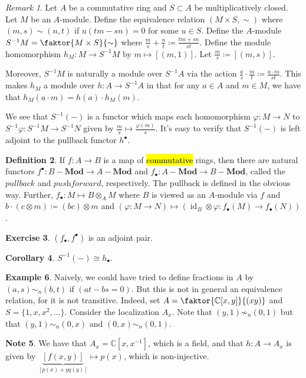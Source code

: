\documentclass[10pt,letterpaper,cm]{nupset}
\theoremstyle{definition}
\newtheorem{definition}{Definition}[subsection]
\newtheorem{exmp}[definition]{Example}
\newtheorem{note}[definition]{Note}
\theoremstyle{theorem}
\newtheorem{corollary}[definition]{Corollary}
\newtheorem{exercise}[definition]{Exercise}
\theoremstyle{remark}
\newtheorem{remark}[definition]{Remark}
\newcommand{\C}{\mathbb C}
\newcommand{\1}{\mathbf{1}}
\newcommand{\0}{\vec 0}
\DeclareMathOperator{\id}{id}
\begin{document}
\begin{remark}
Let $A$ be a commutative ring and $S \subset A$ be multiplicatively closed. Let $M$ be an $A$-module. Define the equivalence relation $(M \times S, \sim)$ where $(m, s) \sim (n, t)$ if $u(tm - sn) = 0$ for some $u\in S$. Define the $A$-module $S^{-1}M = \faktor{M \times S}{\sim}$ where $\frac{m}{s} + \frac{n}{t} \coloneqq  \frac{tm + sn}{st}$. Define the module homomorphism $h_M : M \to S^{-1}M$ by $m \mapsto [(m,1)]$.  Let $\frac{m}{s} \coloneqq  [(m,s)]$.

Moreover, $S^{-1}M$ is naturally a module over $S^{-1}A$ via the action $\frac{a}{s} \cdot \frac{m}{t} \coloneqq  \frac{a\cdot m}{st}$. This makes $h_M$ a module over $h: A \to S^{-1}A$ in  that for any $a\in A$ and $m\in M$, we have that $h_M(a\cdot m) = h(a) \cdot h_M(m)$.

We see that $S^{-1}(-)$ is a functor which maps each homomorphism $\varphi : M \to N$ to $S^{-1}\varphi : S^{-1}M \to S^{-1}N$ given by $\frac{m}{s} \mapsto \frac{\varphi(m)}{s}$.  It's easy to verify that $S^{-1}(-)$ is left adjoint to the pullback functor $h^{\bullet}$.
\end{remark}

\begin{definition}
If $f: A \to B$ is a map of \hl{commutative} rings, then there are natural functors $f^{\bullet}: B{-}\mathbf{Mod} \to A{-}\mathbf{Mod}$ and $f_{\bullet} : A{-} \mathbf{Mod} \to B{-} \mathbf{Mod}$, called the $\textit{pullback}$ and $\textit{pushforward}$, respectively. The pullback is defined in the obvious way. Further, $f_{\bullet} : M \mapsto B \otimes_A M$ where $B$ is viewed as an $A$-module via $f$ and $b\cdot(c \otimes m) \coloneqq  (bc) \otimes m$ and $(\varphi : M \to N) \mapsto (\id_B \otimes \varphi : f_{\bullet}(M) \to f_{\bullet}(N))$. 
\end{definition}

\begin{exercise}
$(f_{\bullet}, f^{\bullet})$ is an adjoint pair.
\end{exercise}
\begin{corollary}
$S^{-1}(-) \cong h_{\bullet}$.
\end{corollary}

\begin{exmp}
Naively, we could have tried to define fractions in $A$ by  $(a,s) \sim_n (b,t)$ if $(at-bs =0)$. But this is not in general an equivalence relation, for it is not transitive. Indeed, set $A = \faktor{\C[x,y]}{(xy)}$ and $S = \{1, x, x^2, \ldots\}$. Consider the localization $A_x$. Note that $(y,1) \not \sim_n (0,1)$ but that $(y,1) \sim_n (0,x)$ and $(0,x) \sim_n (0,1)$.
\begin{note}
We have that $A_x = \C[x,x^{-1}]$, which is a field, and that $h: A \to A_x$ is given by $\underbrace{[f(x,y)]}_{[p(x) +yq(y)]} \mapsto p(x)$, which is non-injective.
\end{note}
\end{exmp}
\end{document}

